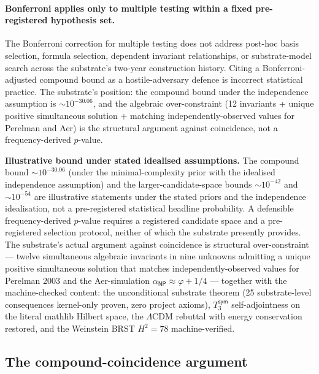 \documentclass[11pt,a4paper]{amsart}
\theoremstyle{plain}
\theoremstyle{definition}
\begin{document}
\paragraph{Bonferroni applies only to multiple testing within a fixed pre-registered hypothesis set.} The Bonferroni correction for multiple testing does not address post-hoc basis selection, formula selection, dependent invariant relationships, or substrate-model search across the substrate's two-year construction history. Citing a Bonferroni-adjusted compound bound as a hostile-adversary defence is incorrect statistical practice. The substrate's position: the compound bound under the independence assumption is $\sim 10^{-30.06}$, and the algebraic over-constraint (12 invariants + unique positive simultaneous solution + matching independently-observed values for Perelman and Aer) is the structural argument against coincidence, not a frequency-derived $p$-value.

\begin{framed}
\noindent\textbf{Illustrative bound under stated idealised assumptions.} The compound bound $\sim 10^{-30.06}$ (under the minimal-complexity prior with the idealised independence assumption) and the larger-candidate-space bounds $\sim 10^{-42}$ and $\sim 10^{-54}$ are illustrative statements under the stated priors and the independence idealisation, not a pre-registered statistical headline probability. A defensible frequency-derived $p$-value requires a registered candidate space and a pre-registered selection protocol, neither of which the substrate presently provides. The substrate's actual argument against coincidence is structural over-constraint --- twelve simultaneous algebraic invariants in nine unknowns admitting a unique positive simultaneous solution that matches independently-observed values for Perelman 2003 and the Aer-simulation $\alpha_{\textsf{NP}} \approx \varphi + 1/4$ --- together with the machine-checked content: the unconditional substrate theorem (25 substrate-level consequences kernel-only proven, zero project axioms), $T_3^{\textsf{sym}}$ self-adjointness on the literal mathlib Hilbert space, the $\Lambda$CDM rebuttal with energy conservation restored, and the Weinstein BRST $H^2 = 78$ machine-verified.
\end{framed}

\subsection{The compound-coincidence argument}\label{subsec:compound-coincidence}
\end{document}
